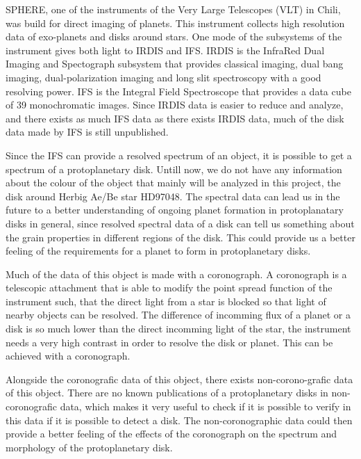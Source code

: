 \documentclass[twoside,single]{lion-msc}
\begin{document}
SPHERE, one of the instruments of the Very Large Telescopes (VLT) in Chili, was build for direct imaging of planets. This instrument collects high resolution data of exo-planets and disks around stars. One mode of the subsystems of the instrument gives both light to IRDIS and IFS. IRDIS is the InfraRed Dual Imaging and Spectograph subsystem that provides classical imaging, dual bang imaging, dual-polarization imaging and long slit spectroscopy with a good resolving power. IFS is the Integral Field Spectroscope that provides a data cube of 39 monochromatic images. \cite{Observatory2007} Since IRDIS data is easier to reduce and analyze, and there exists as much IFS data as there exists IRDIS data, much of the disk data made by IFS is still unpublished. 
\bigskip

Since the IFS can provide a resolved spectrum of an object, it is possible to get a spectrum of a protoplanetary disk. Untill now, we do not have any information about the colour of the object that mainly will be analyzed in this project, the disk around Herbig Ae/Be star HD97048. The spectral data can lead us in the future to a better understanding of ongoing planet formation in protoplanatary disks in general, since resolved spectral data of a disk can tell us something about the grain properties in different regions of the disk. This could provide us a better feeling of the requirements for a planet to form in protoplanetary disks. 
\bigskip

Much of the data of this object is made with a coronograph. A coronograph is a telescopic attachment that is able to modify the point spread function of the instrument such, that the direct light from a star is blocked so that light of nearby objects can be resolved. The difference of incomming flux of a planet or a disk is so much lower than the direct incomming light of the star, the instrument needs a very high contrast in order to resolve the disk or planet. This can be achieved with a coronograph.

\bigskip
Alongside the coronografic data of this object, there exists non-corono-grafic data of this object. There are no known publications of a protoplanetary disks in non-coronografic data, which makes it very useful to check if it is possible to verify in this data if it is possible to detect a disk. The non-coronographic data could then provide a better feeling of the effects of the coronograph on the spectrum and morphology of the protoplanetary disk.
\end{document}
